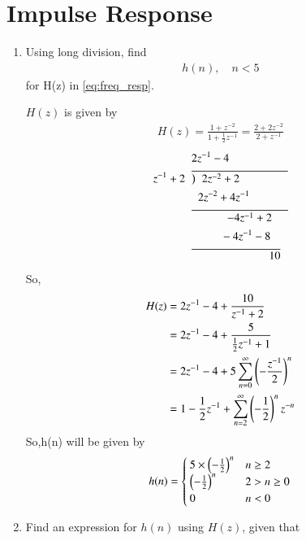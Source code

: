 \documentclass[journal,12pt,twocolumn]{IEEEtran}
\renewcommand\thesection{\arabic{section}}
\begin{document}
\section{Impulse Response}
\begin{enumerate}[label=\thesection.\arabic*]
	\item Using long division, 
	find
	\begin{align}
		h(n), \quad n < 5
	\end{align}
	for H(z) in 
	\eqref{eq:freq_resp}.


\solution $H(z)$ is given by
\begin{align}
	H(z)=\frac{1+z^{-2}}{1+\frac{1}{2}z^{-1}}=\frac{2+2z^{-2}}{2+z^{-1}}
\end{align}
\begin{align}
	&2z^{-1}-4\\	
  z^{-1}+2\hspace{2mm}&\overline{\big)\hspace{2mm} 2z^{-2}+2\hspace{15mm}}\\
	& \hspace{2mm} 2z^{-2}+4z^{-1}\\
	&\overline{\hspace{11mm}-4z^{-1}+2\hspace{5mm}}\\
	&\hspace{9mm}-4z^{-1}-8\\ 
	&\overline{\hspace{24mm}10}
\end{align}
So,
\begin{align}
	H(z)&=2z^{-1}-4+\frac{10}{z^{-1}+2}\\
	&=2z^{-1}-4+\frac{5}{\frac{1}{2}z^{-1}+1}\\
	&=2z^{-1}-4+5\sum_{n=0}^\infty \left(-\frac{z^{-1}}{2}\right)^{n}\\
	&=1-\frac{1}{2}z^{-1}+\sum_{n=2}^\infty \left(-\frac{1}{2}\right)^{n}z^{-n}
\end{align}
So,h(n) will be given by 
\begin{align}
	h(n)=\begin{cases}
		\label{eq:h_n_def}
		5\times \left(-\frac{1}{2}\right)^n  & n\geq 2\\
		\left(-\frac{1}{2}\right)^n  &2>n\geq0\\
		0 &n<0
	\end{cases}
\end{align}
\item \label{prob:impulse_resp}
Find an expression for $h(n)$ using $H(z)$, given that 

\end{enumerate}
\end{document}

